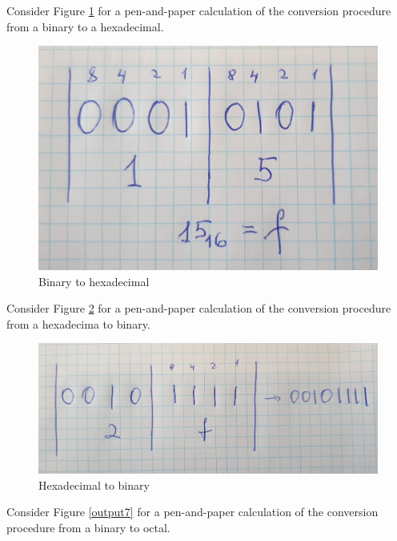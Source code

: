 \documentclass{article}
\begin{document}
\newline
Consider Figure \ref{output5} for a pen-and-paper calculation of the conversion procedure from a binary to a hexadecimal.
\begin{figure}[h!]
  \centering
 \includegraphics[scale=0.1]{Binary_to_hexadecimal.jpg}
 \caption{Binary to hexadecimal}
 \label{output5}
\end{figure}
\newline
Consider Figure \ref{output6} for a pen-and-paper calculation of the conversion procedure from a hexadecima to binary.
\begin{figure}[h!]
  \centering
 \includegraphics[scale=0.1]{Hexadecimal_to_binary.jpg}
 \caption{Hexadecimal to binary}
 \label{output6}
\end{figure}
\newline
Consider Figure \ref{output7} for a pen-and-paper calculation of the conversion procedure from a binary to octal.
\end{document}
